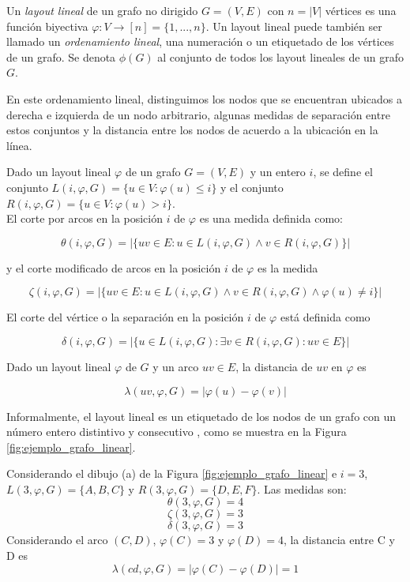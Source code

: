 \begin{definition}\cite{diaz2002survey}
Un {\em layout lineal} de un grafo no dirigido $G=(V,E)$ con $n=|V|$ vértices es una función biyectiva $\varphi : V \rightarrow [n] = \{1,...,n\}$. Un layout lineal puede también ser llamado un {\em ordenamiento lineal}, una numeración o un etiquetado de los vértices de un grafo. Se denota $\phi(G)$ al conjunto de todos los layout lineales de un grafo $G$.
\end{definition}

En este ordenamiento lineal,  distinguimos los  nodos que se encuentran ubicados a derecha e izquierda de un nodo arbitrario, algunas medidas de separación entre estos conjuntos y la distancia entre los nodos de acuerdo a la ubicación en la línea.

\begin{definition}\cite{diaz2002survey}
Dado un layout lineal $\varphi$ de un grafo $G=(V,E)$ y un entero $i$, se define el conjunto $L(i,\varphi,G) = \{u \in V : \varphi(u) \leq i\}$ y el conjunto $R(i,\varphi,G) = \{u \in V : \varphi(u) > i\}$. \\

El corte por arcos en la posición $i$ de $\varphi$ es una medida definida como:

$$\theta(i,\varphi,G) = |\{uv \in E : u \in L(i,\varphi,G) \wedge v \in R(i,\varphi,G)\}|$$

y el corte modificado de arcos en la posición $i$ de $\varphi$ es la medida

$$\zeta(i,\varphi,G)=|\{ uv \in E : u \in L(i,\varphi,G) \wedge v \in R(i,\varphi,G) \wedge \varphi(u) \neq i \}|$$

El corte del vértice o la separación en la posición $i$ de $\varphi$ está definida como

$$\delta(i,\varphi,G)=|\{ u \in L(i,\varphi,G) : \exists v \in R(i,\varphi,G) : uv \in E \}|$$

Dado un layout lineal $\varphi$ de $G$ y un arco $uv \in E$, la distancia de $uv$ en $\varphi$ es

$$\lambda(uv,\varphi,G) = |\varphi(u) - \varphi(v)|$$
\end{definition}


\begin{ejemplo}
Informalmente, el layout lineal es un etiquetado de los nodos de un grafo con un número entero distintivo y consecutivo \cite{diaz2002survey}, como se muestra en la Figura \ref{fig:ejemplo_grafo_linear}.

Considerando el dibujo (a)  de la Figura  \ref{fig:ejemplo_grafo_linear} e $i=3$, $L(3,\varphi,G) = \{A,B,C\}$ y  $R(3,\varphi,G) = \{D,E,F\}$. Las medidas son:
$$\theta(3,\varphi,G) = 4 $$
$$\zeta(3,\varphi,G)=3$$
$$\delta(3,\varphi,G)=3$$
Considerando el arco $(C,D)$,  $ \varphi(C)=3$ y $ \varphi(D)=4$, la distancia entre C y D es
$$\lambda(cd,\varphi,G) = |\varphi(C) - \varphi(D)|=1$$
\end{ejemplo}



